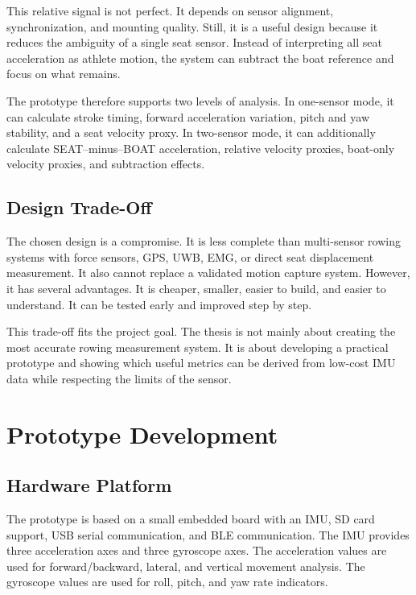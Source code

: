 This relative signal is not perfect. It depends on sensor alignment, synchronization, and mounting quality. Still, it is a useful design because it reduces the ambiguity of a single seat sensor. Instead of interpreting all seat acceleration as athlete motion, the system can subtract the boat reference and focus on what remains.

The prototype therefore supports two levels of analysis. In one-sensor mode, it can calculate stroke timing, forward acceleration variation, pitch and yaw stability, and a seat velocity proxy. In two-sensor mode, it can additionally calculate SEAT--minus--BOAT acceleration, relative velocity proxies, boat-only velocity proxies, and subtraction effects.

\section{Design Trade-Off}

The chosen design is a compromise. It is less complete than multi-sensor rowing systems with force sensors, GPS, UWB, EMG, or direct seat displacement measurement. It also cannot replace a validated motion capture system. However, it has several advantages. It is cheaper, smaller, easier to build, and easier to understand. It can be tested early and improved step by step.

This trade-off fits the project goal. The thesis is not mainly about creating the most accurate rowing measurement system. It is about developing a practical prototype and showing which useful metrics can be derived from low-cost IMU data while respecting the limits of the sensor.


\chapter{Prototype Development} %

\section{Hardware Platform}

The prototype is based on a small embedded board with an IMU, SD card support, USB serial communication, and BLE communication. The IMU provides three acceleration axes and three gyroscope axes. The acceleration values are used for forward/backward, lateral, and vertical movement analysis. The gyroscope values are used for roll, pitch, and yaw rate indicators.

